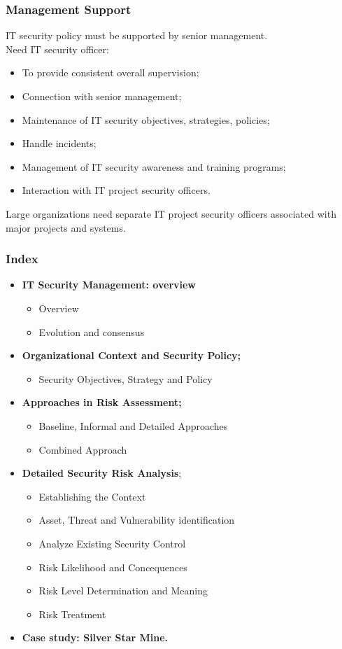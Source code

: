 \documentclass[xcolor ={table,usenames,dvipsnames}]{beamer}
\theoremstyle{definition}
\begin{document}
	\begin{frame}
		\frametitle{Management Support}
		IT security policy must be supported by senior management. \\
		Need IT security officer:
		\begin{itemize}
			\item To provide consistent overall supervision;
			\item Connection with senior management;
			\item Maintenance of IT security objectives, strategies, policies;
			\item Handle incidents;
			\item Management of IT security awareness and training programs;
			\item Interaction with IT project security officers.
		\end{itemize}
		Large organizations need separate IT project security officers associated with major projects and systems.
	\end{frame}
	
	\begin{frame}
		\frametitle{Index}
		\begin{itemize}
			\item <0> \textbf{IT Security Management: overview}
			\begin{itemize}
				\item Overview
				\item Evolution and consensus
			\end{itemize}
			\item <0>  \textbf{Organizational Context and Security Policy;}
			\begin{itemize}
				\item Security Objectives, Strategy and Policy
			\end{itemize}
			\item <1->  \textbf{Approaches in Risk Assessment;}
			\begin{itemize}
				\item Baseline, Informal and Detailed Approaches
				\item Combined Approach
			\end{itemize}
			\item <0> \textbf{Detailed Security Risk Analysis};
			\begin{itemize}
				\item Establishing the Context
				\item Asset, Threat and Vulnerability identification
				\item Analyze Existing Security Control
				\item Risk Likelihood and Concequences
				\item Risk Level Determination and Meaning
				\item Risk Treatment
			\end{itemize}
			\item <0> \textbf{Case study: Silver Star Mine.}
		\end{itemize}
	\end{frame}
	
\end{document}
